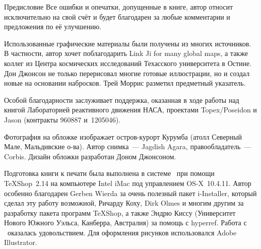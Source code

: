 \begin{chapter}{Предисловие}
Все ошибки и опечатки, допущенные в книге, автор относит исключительно
на свой счёт и будет благодарен за любые комментарии и предложения по
её улучшению.

Использованные графические материалы были получены из многих
источников.  В частности, автор хочет поблагодарить Link Ji for many
global maps, а также коллег из Центра космических исследований
Техасского университета в Остине. Дон Джонсон не только перерисовал
многие готовые иллюстрации, но и создал новые на основании
набросков. Трей Моррис разметил предметный указатель.

Особой благодарности заслуживает поддержка, оказанная в ходе работы над книгой
Лабораторией реактивного движения НАСА, проектами Topex/Poseidon и Jason
(контракты 960887 и~1205046).

Фотография на обложке изображает остров-курорт Курумба (атолл
Северный Мале, Мальдивские о-ва). Автор снимка~--- Jagdish Agara,
правообладатель~--- Corbis. Дизайн обложки разработан Доном Джонсоном.

Подготовка книги к печати была выполнена в системе \LaTeXe\ при помощи
TeXShop~2.14 на компьютере Intel iMac под управлением OS-X~10.4.11.
Автор особенно благодарен Gerben Wierda за очень полезный пакет i-Installer,
который сделал эту работу возможной, Ричарду Коху, Dirk Olmes
и многим другим за разработку пакета программ TeXShop,
а также Эндрю Киссу (Университет Нового Южного Уэльса, Канберра, Австралия)
за помощь с hyperref.
Работа с \LaTeXe\ оказалась удовольствием.
Для оформления рисунков использовался Adobe Illustrator.
\end{chapter}
